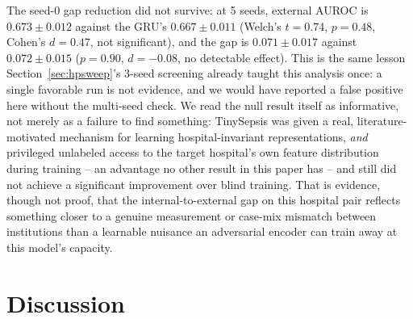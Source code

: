 \documentclass[11pt]{article}
\begin{document}
\begin{table}[t]
\centering
\caption{DANN transductive domain adaptation vs.\ the GRU's blind holdout. The single-seed row is what a first pass at this experiment would have reported; the 5-seed mean is what we actually found.}
\label{tab:dann}

\end{table}

The seed-0 gap reduction did not survive: at 5 seeds, external AUROC is $0.673\pm0.012$ against the GRU's $0.667\pm0.011$ (Welch's $t=0.74$, $p=0.48$, Cohen's $d=0.47$, not significant), and the gap is $0.071\pm0.017$ against $0.072\pm0.015$ ($p=0.90$, $d=-0.08$, no detectable effect). This is the same lesson Section~\ref{sec:hpsweep}'s 3-seed screening already taught this analysis once: a single favorable run is not evidence, and we would have reported a false positive here without the multi-seed check. We read the null result itself as informative, not merely as a failure to find something: TinySepsis was given a real, literature-motivated mechanism for learning hospital-invariant representations, \emph{and} privileged unlabeled access to the target hospital's own feature distribution during training -- an advantage no other result in this paper has -- and still did not achieve a significant improvement over blind training. That is evidence, though not proof, that the internal-to-external gap on this hospital pair reflects something closer to a genuine measurement or case-mix mismatch between institutions than a learnable nuisance an adversarial encoder can train away at this model's capacity.

\section{Discussion}
\label{sec:discussion}
\end{document}

